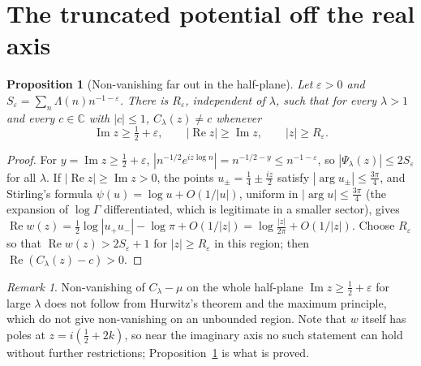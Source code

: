 \documentclass[11pt]{amsart}
\newtheorem{proposition}[theorem]{Proposition}
\theoremstyle{definition}
\theoremstyle{remark}
\newtheorem*{remark*}{Remark}
\renewcommand{\Re}{\operatorname{Re}}
\renewcommand{\Im}{\operatorname{Im}}
\newcommand{\half}{\tfrac12}
\newcommand{\Clam}{C_\lambda}
\newcommand{\Psil}{\Psi_\lambda}
\newcommand{\psidig}{\psi}
\begin{document}
\section{The truncated potential off the real axis}\label{sec:geom}

\begin{proposition}[Non-vanishing far out in the half-plane]\label{thm:zero-free}
Let $\varepsilon>0$ and $S_\varepsilon=\sum_n\Lambda(n)n^{-1-\varepsilon}$. There is
$R_\varepsilon$, independent of $\lambda$, such that for every $\lambda>1$ and every
$c\in\mathbb C$ with $|c|\le1$, $\Clam(z)\ne c$ whenever
\[
\Im z\ge\half+\varepsilon,\qquad|\Re z|\ge\Im z,\qquad|z|\ge R_\varepsilon.
\]
\end{proposition}
\begin{proof}
For $y=\Im z\ge\half+\varepsilon$, $|n^{-1/2}e^{iz\log n}|=n^{-1/2-y}\le n^{-1-\varepsilon}$, so
$|\Psil(z)|\le2S_\varepsilon$ for all $\lambda$. If $|\Re z|\ge\Im z>0$, the points
$u_\pm=\frac14\pm\frac{iz}2$ satisfy $|\arg u_\pm|\le\frac{3\pi}4$, and Stirling's formula
$\psidig(u)=\log u+O(1/|u|)$, uniform in $|\arg u|\le\frac{3\pi}4$ \cite[Ch.~8, \S4]{Olver} (the expansion of $\log\Gamma$
differentiated, which is legitimate in a smaller sector),
gives $\Re w(z)=\half\log|u_+u_-|-\log\pi+O(1/|z|)=\log\frac{|z|}{2\pi}+O(1/|z|)$. Choose
$R_\varepsilon$ so that $\Re w(z)>2S_\varepsilon+1$ for $|z|\ge R_\varepsilon$ in this region;
then $\Re(\Clam(z)-c)>0$.
\end{proof}

\begin{remark*}
Non-vanishing of $\Clam-\mu$ on the whole half-plane $\Im z\ge\half+\varepsilon$ for large
$\lambda$ does not follow from Hurwitz's theorem and the maximum principle, which do not give
non-vanishing on an unbounded region. Note that $w$ itself has poles at
$z=i(\half+2k)$, so near the imaginary axis no such statement can hold without further
restrictions; Proposition~\ref{thm:zero-free} is what is proved.
\end{remark*}
\end{document}
